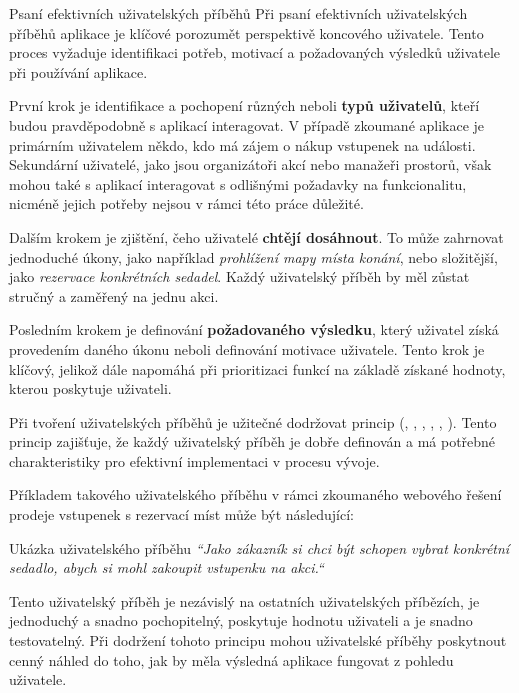 \begin{subsection}{Psaní efektivních uživatelských příběhů}
    \label{subsec:navrh-ui-uzivatelske-pribehy-psani-efektivnich}
    Při psaní efektivních uživatelských příběhů aplikace je klíčové porozumět perspektivě koncového uživatele.
    Tento proces vyžaduje identifikaci potřeb, motivací a požadovaných výsledků uživatele při používání aplikace.

    První krok je identifikace a pochopení různých  neboli \textbf{typů uživatelů}, kteří budou pravděpodobně s aplikací interagovat.
    V případě zkoumané aplikace je primárním uživatelem někdo, kdo má zájem o nákup vstupenek na události.
    Sekundární uživatelé, jako jsou organizátoři akcí nebo manažeři prostorů, však mohou také s aplikací interagovat s odlišnými požadavky na funkcionalitu, nicméně jejich potřeby nejsou v rámci této práce důležité.

    Dalším krokem je zjištění, čeho uživatelé \textbf{chtějí dosáhnout}.
    To může zahrnovat jednoduché úkony, jako například \textit{prohlížení mapy místa konání}, nebo složitější, jako \textit{rezervace konkrétních sedadel}.
    Každý uživatelský příběh by měl zůstat stručný a zaměřený na jednu akci.

    Posledním krokem je definování \textbf{požadovaného výsledku}, který uživatel získá provedením daného úkonu neboli definování motivace uživatele.
    Tento krok je klíčový, jelikož dále napomáhá při prioritizaci funkcí na základě získané hodnoty, kterou poskytuje uživateli.

    Při tvoření uživatelských příběhů je užitečné dodržovat princip  (, , , , , ).
    Tento princip zajišťuje, že každý uživatelský příběh je dobře definován a má potřebné charakteristiky pro efektivní implementaci v procesu vývoje\cite{w_glossary_invest}.

    Příkladem takového uživatelského příběhu v rámci zkoumaného webového řešení prodeje vstupenek s rezervací míst může být následující:

    \begin{gray-box}{Ukázka uživatelského příběhu}
        \textit{``Jako zákazník si chci být schopen vybrat konkrétní sedadlo, abych si mohl zakoupit vstupenku na akci.``}
    \end{gray-box}

    Tento uživatelský příběh je nezávislý na ostatních uživatelských příbězích, je jednoduchý a snadno pochopitelný, poskytuje hodnotu uživateli a je snadno testovatelný.
    Při dodržení tohoto principu mohou uživatelské příběhy poskytnout cenný náhled do toho, jak by měla výsledná aplikace fungovat z pohledu uživatele.
\end{subsection}

